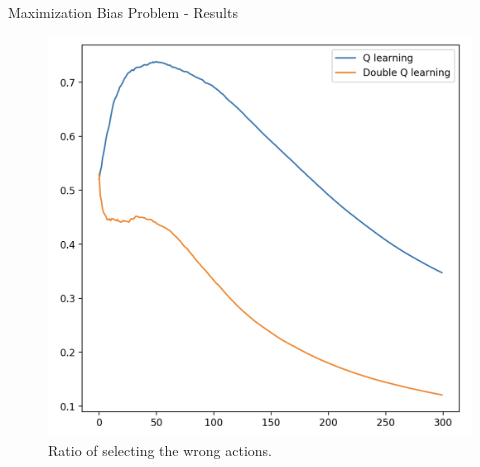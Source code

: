 \documentclass{beamer}
\begin{document}
\begin{frame}{Maximization Bias Problem - Results}
\begin{figure}[htpb]
    \centering
    \includegraphics[width=0.7\linewidth]{pic/doubleQ.png}
    \caption{Ratio of selecting the wrong actions.}
\end{figure}
\end{frame}



    



\end{document}
